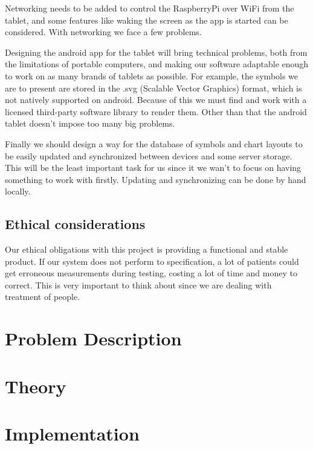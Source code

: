 \documentclass[12pt,a4paper,notitlepage]{report}
\begin{document}
Networking needs to be added to control the RaspberryPi over WiFi from the tablet, and some features like waking the screen as the app is started can be considered. With networking we face a few problems. %

Designing the android app for the tablet will bring technical problems, both from the limitations of portable computers, and making our software adaptable enough to work on as many brands of tablets as possible. For example, the symbols we are to present are stored in the .svg (Scalable Vector Graphics) format, which is not natively supported on android. Because of this we must find and work with a licensed third-party software library to render them. Other than that the android tablet doesn't impose too many big problems. %

Finally we should design a way for the database of symbols and chart layouts to be easily updated and synchronized between devices and some server storage. This will be the least important task for us since it we wan't to focus on having something to work with firstly. Updating and synchronizing can be done by hand locally.

\section{Ethical considerations} %
Our ethical obligations with this project is providing a functional and stable product. If our system does not perform to specification, a lot of patients could get erroneous measurements during testing, costing a lot of time and money to correct. This is very important to think about since we are dealing with treatment of people.

\chapter{Problem Description}

\chapter{Theory}

\chapter{Implementation}
\end{document}
